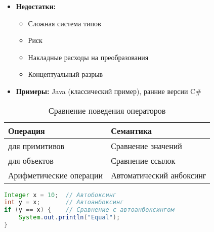 \begin{itemize}
    \item \textbf{Недостатки:}
    \begin{itemize}
        \item Сложная система типов
        \item Риск 
        \item Накладные расходы на преобразования
        \item Концептуальный разрыв
    \end{itemize}

    \item \textbf{Примеры:} Java (классический пример), ранние версии C\#
\end{itemize}

\begin{table}[h]
\centering
\caption{Сравнение поведения операторов}
\begin{tabular}{ll}
\toprule
\textbf{Операция} & \textbf{Семантика} \\
\midrule
\code{==} для примитивов & Сравнение значений \\
\code{==} для объектов & Сравнение ссылок \\
Арифметические операции & Автоматический анбоксинг \\
\bottomrule
\end{tabular}
\end{table}

\begin{lstlisting}[language=java,caption=Пример в Java]
Integer x = 10;  // Автобоксинг
int y = x;       // Автоанбоксинг
if (y == x) {    // Сравнение с автоанбоксингом
    System.out.println("Equal");
}
\end{lstlisting}

